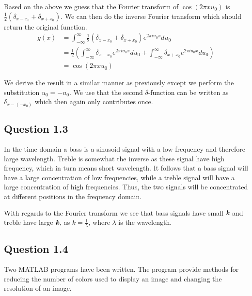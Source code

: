 \documentclass[a4paper, 10pt, final]{article}
\begin{document}
Based on the above we guess that the Fourier transform of $\cos(2\pi
xu_0)$ is $\frac{1}{2}(\delta_{x - x_0} + \delta_{x + x_0})$. We can
then do the inverse Fourier transform which should return the original
function.
\begin{align*}
    g(x) & = \int_{-\infty}^{\infty}{\frac{1}{2}(\delta_{x - x_0} +
    \delta_{x + x_0})e^{2\pi iu_0x}du_0}\\
    & = \frac{1}{2}\left( \int_{-\infty}^{\infty}{\delta_{x -
    x_0}e^{2\pi iu_0x}du_0} + \int_{-\infty}^{\infty}{\delta_{x +
    x_0}e^{2\pi iu_0x}du_0}\right)\\
    & = \cos(2\pi xu_0)
\end{align*}

We derive the result in a similar manner as previously except we
perform the substitution $u_0 = - u_0$. We use that the second
$\delta$-function can be written as $\delta_{x - (-x_0)}$ which then
again only contributes once.

\subsection*{Question 1.3}
In the time domain a bass is a sinusoid signal with a low frequency and
therefore large wavelength. Treble is somewhat the inverse as these
signal have high frequency, which in turn means short wavelength.  It
follows that a bass signal will have a large concentration of low
frequencies, while a treble signal will have a large concentration of
high frequencies. Thus, the two signals will be concentrated at
different positions in the frequency domain.

With regards to the Fourier transform we see that bass signals have
small $\textbf{\em k}$ and treble have large $\textbf{\em k}$, as $k =
\frac{1}{\lambda}$, where $\lambda$ is the wavelength.

\subsection*{Question 1.4}
Two MATLAB programs have been written. The program provide methods for
reducing the number of colors used to display an image and changing the
resolution of an image.
\end{document}
